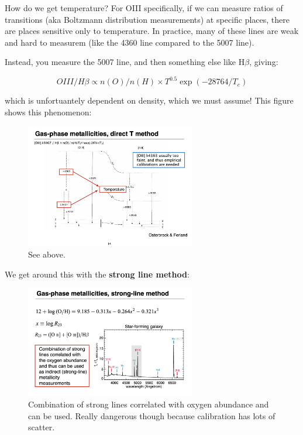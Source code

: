 \documentclass{article}
\begin{document}
How do we get temperature? For OIII specifically, if we can measure ratios of transitions (aka Boltzmann distribution measurements) at specific places, there are places sensitive only to temperature. In practice, many of these lines are weak and hard to measurem (like the 4360 line compared to the 5007 line). 

Instead, you measure the 5007 line, and then something else like H$\beta$, giving:

\begin{equation}
    OIII / H\beta \propto n(O) / n(H) \times T^{0.5} \exp{(-28764/T_e)}
\end{equation}

which is unfortuantely dependent on density, which we must assume! This figure shows this phenomenon:

\begin{figure}
    \centering
    \includegraphics[width=0.66\textwidth]{figs/Screen Shot 2021-10-06 at 10.50.13 AM.png}
    \caption{See above.}
    \label{fig:see}
\end{figure}

We get around this with the \textbf{strong line method}:

\begin{figure}
    \centering
    \includegraphics[width=0.66\textwidth]{figs/Screen Shot 2021-10-06 at 10.50.51 AM.png}
    \caption{Combination of strong lines correlated with oxygen abundance and can be used. Really dangerous though because calibration has lots of scatter. }
    \label{fig:strong_Line_method}
\end{figure}
\end{document}
